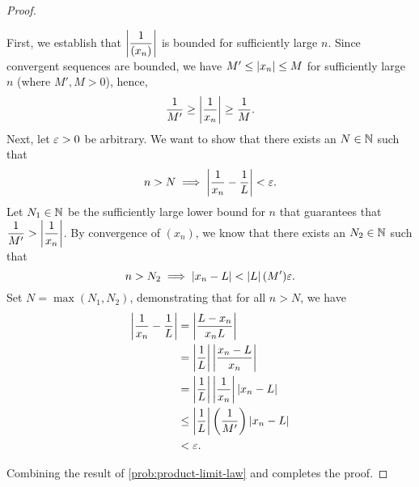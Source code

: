 \begin{problem}
\begin{enumerate}[label=(\alph*)]
\begin{proof}
        \begin{subproof}
          First, we establish that $\left\lvert \dfrac{1}{(x_{n})} \right\rvert$ is bounded for
          sufficiently large $n$. Since convergent\footnotemark{} sequences are
          bounded, we have $M' \leq \left\lvert x_{n} \right\rvert \leq M$ for sufficiently large $n$
          (where $M', M > 0$), hence, 
          \[
            \dfrac{1}{M'} \geq \left\lvert \dfrac{1}{x_{n}} \right\rvert \geq \dfrac{1}{M}.
          \]
          Next, let $\varepsilon > 0$ be arbitrary. We want to show that there exists
          an $N \in \mathbb{N}$ such that
          \begin{align*}
            n > N \implies \left\lvert \frac{1}{x_{n}} - \frac{1}{L} \right\rvert < \varepsilon.
          \end{align*}
          Let $N_{1} \in \mathbb{N}$ be the sufficiently large lower bound for $n$ that guarantees that
          $\dfrac{1}{M'} > \left\lvert \dfrac{1}{x_{n}} \right\rvert$. By convergence of
          $(x_{n})$, we know that there exists an $N_{2} \in \mathbb{N}$ such that
          \[
            n > N_{2} \implies \left\lvert x_{n} - L \right\rvert < \left\lvert L \right\rvert (M') \varepsilon.
          \]
          Set $N = \max(N_{1}, N_{2})$, demonstrating that for all $n > N$, we have
          \begin{align*}
            \left\lvert \dfrac{1}{x_{n}} - \dfrac{1}{L} \right\rvert &= \left\lvert \dfrac{L - x_{n}}{x_{n}L} \right\rvert \\
                                                  &= \left\lvert \dfrac{1}{L} \right\rvert \left\lvert \dfrac{x_{n} - L}{x_{n}} \right\rvert \\
                                                  &= \left\lvert \dfrac{1}{L} \right\rvert \left\lvert \dfrac{1}{x_{n}} \right\rvert \left\lvert x_{n} - L \right\rvert \\
                                                  &\leq \left\lvert \dfrac{1}{L} \right\rvert \left( \dfrac{1}{M'} \right) \left\lvert x_{n} - L \right\rvert \\
                                                  &< \varepsilon.
          \end{align*}
        \end{subproof}

        Combining the result of \ref{prob:product-limit-law} and
         completes the proof.
      \end{proof}

  \end{enumerate}
\end{problem}

